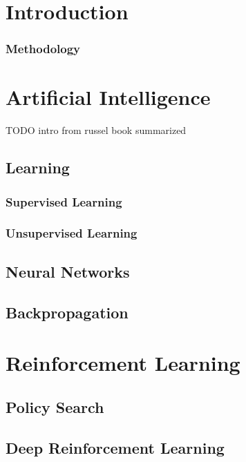 \chapter{Introduction}

\subsection{Methodology}


\chapter{Artificial Intelligence}

 TODO intro from russel book summarized 
\section{Learning}

\subsection{Supervised Learning}

\subsection{Unsupervised Learning}

\section{Neural Networks}%
\label{sec:neural_networks}

\section{Backpropagation}
\label{sec:Backpropagation}

\chapter{Reinforcement Learning}
\section{Policy Search}
\section{Deep Reinforcement Learning}

